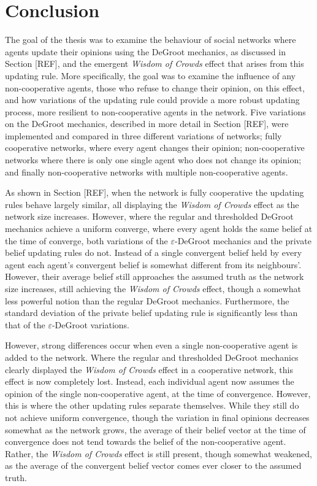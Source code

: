 \documentclass[a4paper, 12pt]{report}
\begin{document}
\newpage

\chapter{Conclusion}

The goal of the thesis was to examine the behaviour of social networks where agents update their opinions using the DeGroot mechanics, as discussed in Section [REF], and the emergent \emph{Wisdom of Crowds} effect that arises from this updating rule. More specifically, the goal was to examine the influence of any non-cooperative agents, those who refuse to change their opinion, on this effect, and how variations of the updating rule could provide a more robust updating process, more resilient to non-cooperative agents in the network. Five variations on the DeGroot mechanics, described in more detail in Section [REF], were implemented and compared in three different variations of networks; fully cooperative networks, where every agent changes their opinion; non-cooperative networks where there is only one single agent who does not change its opinion; and finally non-cooperative networks with multiple non-cooperative agents. 

\noindent As shown in Section [REF], when the network is fully cooperative the updating rules behave largely similar, all displaying the \emph{Wisdom of Crowds} effect as the network size increases. However, where the regular and thresholded DeGroot mechanics achieve a uniform converge, where every agent holds the same belief at the time of converge, both variations of the $\varepsilon$-DeGroot mechanics and the private belief updating rules do not. Instead of a single convergent belief held by every agent each agent's convergent belief is somewhat different from its neighbours'. However, their average belief still approaches the assumed truth as the network size increases, still achieving the \emph{Wisdom of Crowds} effect, though a somewhat less powerful notion than the regular DeGroot mechanics. Furthermore, the standard deviation of the private belief updating rule is significantly less than that of the $\varepsilon$-DeGroot variations.

\noindent However, strong differences occur when even a single non-cooperative agent is added to the network. Where the regular and thresholded DeGroot mechanics clearly displayed the \emph{Wisdom of Crowds} effect in a cooperative network, this effect is now completely lost. Instead, each individual agent now assumes the opinion of the single non-cooperative agent, at the time of convergence. However, this is where the other updating rules separate themselves. While they still do not achieve uniform convergence, though the variation in final opinions decreases somewhat as the network grows, the average of their belief vector at the time of convergence does not tend towards the belief of the non-cooperative agent. Rather, the \emph{Wisdom of Crowds} effect is still present, though somewhat weakened, as the average of the convergent belief vector comes ever closer to the assumed truth.
\end{document}
